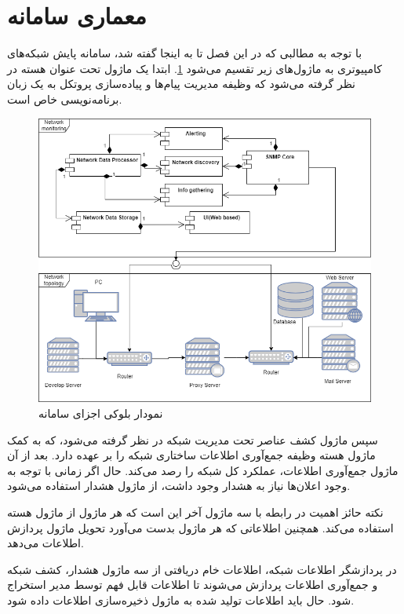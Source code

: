 \newpage

\section{معماری سامانه}




با توجه به مطالبی که در این فصل تا به اینجا گفته شد، سامانه پایش شبکه‌های کامپیوتری به ماژول‌های زیر تقسیم می‌شود \cref{fig.11}. ابتدا یک ماژول تحت عنوان هسته  در نظر گرفته می‌شود که وظیفه مدیریت پیام‌ها و پیاده‌سازی پروتکل به یک زبان برنامه‌نویسی خاص است.




\begin{figure}[!h]
\centering\includegraphics[scale=.55]{./diagram}
\caption{نمودار بلوکی اجزای سامانه}\label{fig.11}
\end{figure}


سپس ماژول کشف عناصر تحت مدیریت شبکه در نظر گرفته می‌شود، که به کمک ماژول هسته وظیفه جمع‌آوری اطلاعات ساختاری شبکه را بر عهده دارد. بعد از آن ماژول جمع‌آوری اطلاعات، عملکرد کل شبکه را رصد می‌کند. حال اگر زمانی با توجه به وجود اعلان‌ها نیاز به هشدار وجود داشت، از ماژول هشدار استفاده می‌شود. 

\newpage

نکته حائز اهمیت در رابطه با سه ماژول آخر این است که هر ماژول از ماژول هسته استفاده می‌کند. همچنین اطلاعاتی که هر ماژول بدست می‌آورد تحویل ماژول پردازش اطلاعات می‌دهد.

در پردازشگر اطلاعات شبکه، اطلاعات خام دریافتی از سه ماژول هشدار، کشف شبکه و جمع‌آوری اطلاعات پردازش می‌شوند تا اطلاعات قابل فهم توسط مدیر استخراج شود. حال باید اطلاعات تولید شده به ماژول ذخیره‌سازی اطلاعات داده شود.

